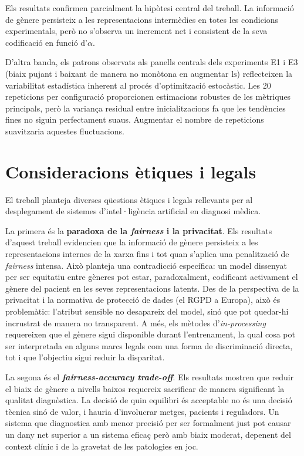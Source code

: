 \documentclass[a4paper,12pt,twoside]{ThesisStyle}
\begin{document}
Els resultats confirmen parcialment la hipòtesi central del treball. La informació de gènere persisteix a les representacions intermèdies en totes les condicions experimentals, però no s'observa un increment net i consistent de la seva codificació en funció d'$\alpha$.

D'altra banda, els patrons observats als panells centrals dels experiments E1 i E3 (biaix pujant i baixant de manera no monòtona en augmentar $\text{ls}$) reflecteixen la variabilitat estadística inherent al procés d'optimització estocàstic. Les 20 repeticions per configuració proporcionen estimacions robustes de les mètriques principals, però la variança residual entre inicialitzacions fa que les tendències fines no siguin perfectament suaus. Augmentar el nombre de repeticions suavitzaria aquestes fluctuacions.

\section{Consideracions ètiques i legals}

El treball planteja diverses qüestions ètiques i legals rellevants per al desplegament de sistemes d'intel·ligència artificial en diagnosi mèdica.

La primera és la \textbf{paradoxa de la \textit{fairness} i la privacitat}. Els resultats d'aquest treball evidencien que la informació de gènere persisteix a les representacions internes de la xarxa fins i tot quan s'aplica una penalització de \textit{fairness} intensa. Això planteja una contradicció específica: un model dissenyat per ser equitatiu entre gèneres pot estar, paradoxalment, codificant activament el gènere del pacient en les seves representacions latents. Des de la perspectiva de la privacitat i la normativa de protecció de dades (el RGPD a Europa), això és problemàtic: l'atribut sensible no desapareix del model, sinó que pot quedar-hi incrustrat de manera no transparent. A més, els mètodes d'\textit{in-processing} requereixen que el gènere sigui disponible durant l'entrenament, la qual cosa pot ser interpretada en alguns marcs legals com una forma de discriminació directa, tot i que l'objectiu sigui reduir la disparitat.

La segona és el \textbf{\textit{fairness-accuracy trade-off}}. Els resultats mostren que reduir el biaix de gènere a nivells baixos requereix sacrificar de manera significant la qualitat diagnòstica. La decisió de quin equilibri és acceptable no és una decisió tècnica sinó de valor, i hauria d'involucrar metges, pacients i reguladors. Un sistema que diagnostica amb menor precisió per ser formalment just pot causar un dany net superior a un sistema eficaç però amb biaix moderat, depenent del context clínic i de la gravetat de les patologies en joc.
\end{document}
